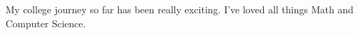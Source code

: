 \documentclass{article}
\begin{document}
My college journey so far has been really exciting. I've loved all things Math and Computer Science. 



\end{document}
